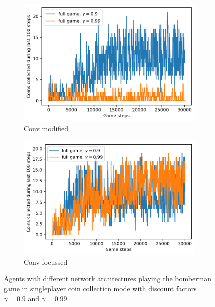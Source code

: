 
\begin{figure}
  \centering
  \begin{subfigure}[b]{0.48\linewidth}
    \centering
    	\includegraphics[width=\linewidth]{images/fullgame-conv1-4-3-arch.png}
    \caption{Conv modified}
    \label{fig:fullcoins-conv-mod}
  \end{subfigure}
  \quad
  \begin{subfigure}[b]{0.48\linewidth}
    \centering
      \includegraphics[width=\linewidth]{images/fullgame-focus-arch.png}
    \caption{Conv focussed}
    \label{fig:fullcoins-conv-focus}
  \end{subfigure}
  \caption{Agents with different network architectures playing the bomberman game in singleplayer coin collection mode with discount factors $\gamma=0.9$ and $\gamma=0.99$.}
  \label{fig:networks}
\end{figure}
